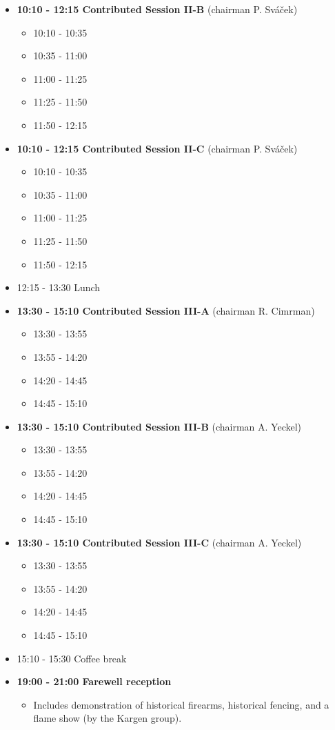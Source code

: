 \documentclass[10pt, A4]{article}%
\begin{document}
\begin{itemize}
  \item {\bf 10:10 - 12:15 Contributed Session II-B} (chairman P. Sv\'a\v cek) 
  \begin{itemize}
    \item 10:10 - 10:35 
    \item 10:35 - 11:00 
    \item 11:00 - 11:25 
    \item 11:25 - 11:50 
    \item 11:50 - 12:15 
  \end{itemize}
    \item {\bf 10:10 - 12:15 Contributed Session II-C} (chairman P. Sv\'a\v cek) 
  \begin{itemize}
    \item 10:10 - 10:35 
    \item 10:35 - 11:00 
    \item 11:00 - 11:25 
    \item 11:25 - 11:50 
    \item 11:50 - 12:15 
  \end{itemize}
  \item 12:15 - 13:30 Lunch
  \item {\bf 13:30 - 15:10 Contributed Session III-A} (chairman R. Cimrman) 
  \begin{itemize}
    \item 13:30 - 13:55 
    \item 13:55 - 14:20 
    \item 14:20 - 14:45 
    \item 14:45 - 15:10 
  \end{itemize}
  \item {\bf 13:30 - 15:10 Contributed Session III-B} (chairman A. Yeckel) 
  \begin{itemize}
    \item 13:30 - 13:55 
    \item 13:55 - 14:20 
    \item 14:20 - 14:45 
    \item 14:45 - 15:10 
  \end{itemize}
    \item {\bf 13:30 - 15:10 Contributed Session III-C} (chairman A. Yeckel) 
  \begin{itemize}
    \item 13:30 - 13:55 
    \item 13:55 - 14:20 
    \item 14:20 - 14:45 
    \item 14:45 - 15:10 
  \end{itemize}
  \item 15:10 - 15:30 Coffee break
  \item {\bf 19:00 - 21:00 Farewell reception}
    \begin{itemize}
     \item Includes demonstration of historical firearms, historical fencing, and a flame show (by the Kargen group).
  \end{itemize} 
\end{itemize}
\end{document}
